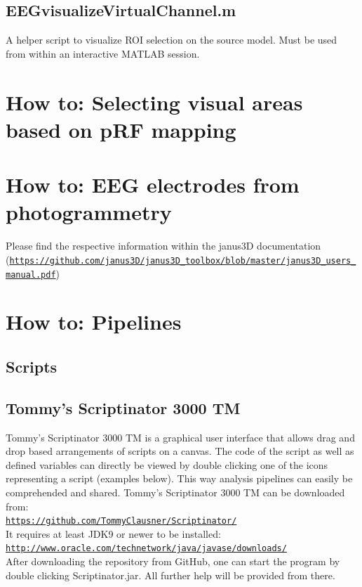 \documentclass[12pt,a4paper]{scrartcl}
\begin{document}
\subsection{EEGvisualizeVirtualChannel.m}
A helper script to visualize ROI selection on the source model. Must be used from within an interactive MATLAB session.

\section{How to: Selecting visual areas based on pRF mapping}
\label{sec:GUIprf}

\section{How to: EEG electrodes from photogrammetry}
\label{sec:janus3D}
Please find the respective information within the janus3D documentation (\href{https://github.com/janus3D/janus3D_toolbox/blob/master/janus3D_users_manual.pdf}{\nolinkurl{https://github.com/janus3D/janus3D_toolbox/blob/master/janus3D_users_manual.pdf}})

\section{How to: Pipelines}
\label{sec:pipelines}
\subsection{Scripts}
\subsection{Tommy's Scriptinator 3000 TM}
\label{sec:scriptinator}
Tommy's Scriptinator 3000 TM is a graphical user interface that allows drag and drop based arrangements of scripts on a canvas. The code of the script as well as defined variables can directly be viewed by double clicking one of the icons representing a script (examples below). This way analysis pipelines can easily be comprehended and shared. Tommy's Scriptinator 3000 TM can be downloaded from:\\

\href{https://github.com/TommyClausner/Scriptinator/}{\nolinkurl{https://github.com/TommyClausner/Scriptinator/}}\\

\noindent It requires at least JDK9 or newer to be installed:\\

\href{http://www.oracle.com/technetwork/java/javase/downloads/}{\nolinkurl{http://www.oracle.com/technetwork/java/javase/downloads/}}\\

\noindent After downloading the repository from GitHub, one can start the program by double clicking Scriptinator.jar. All further help will be provided from there.
\end{document}

